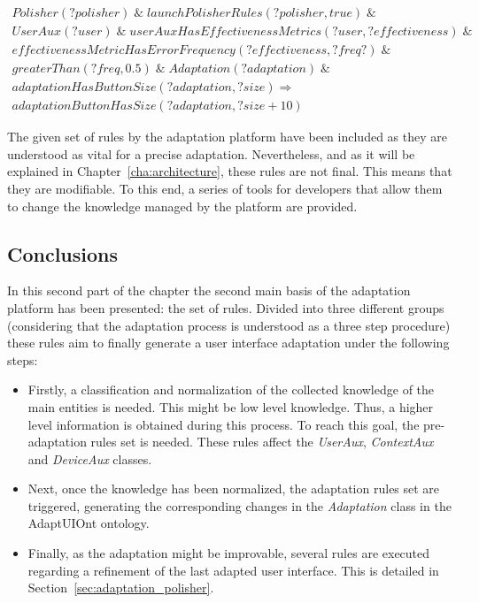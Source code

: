 \footnotesize
\begin{equation} \label{ec:post_adaptation_rule}
  \begin{align*} 
  Polisher(?polisher)\; \&\; launchPolisherRules(?polisher, true)\; \&\\
  UserAux(?user)\; \&\; userAuxHasEffectivenessMetrics(?user, ?effectiveness)\; \& \\
  effectivenessMetricHasErrorFrequency(?effectiveness, ?freq?)\; \&\\
  greaterThan(?freq, 0.5)\; \&\; Adaptation(?adaptation)\; \&\\
  adaptationHasButtonSize(?adaptation, ?size)
  \Rightarrow \\
  adaptationButtonHasSize(?adaptation, ?size + 10)
  \end{align*}
\end{equation}
\normalsize



The given set of rules by the adaptation platform have been included as they are
understood as vital for a precise adaptation. Nevertheless, and as it will be
explained in Chapter~\ref{cha:architecture}, these rules are not final. This
means that they are modifiable. To this end, a series of tools for developers
that allow them to change the knowledge managed by the platform are provided.


\subsection{Conclusions}
\label{sec:rules_conclusions}

In this second part of the chapter the second main basis of the adaptation platform
has been presented: the set of rules. Divided into three different groups
(considering that the adaptation process is understood as a three step procedure)
these rules aim to finally generate a user interface adaptation under the following
steps:

\begin{itemize}
  \item Firstly, a classification and normalization of the collected knowledge of
  the main entities is needed. This might be low level knowledge. Thus, a higher
  level information is obtained during this process. To reach this goal, the
  pre-adaptation rules set is needed. These rules affect the \textit{UserAux},
  \textit{ContextAux} and \textit{DeviceAux} classes.
  
  \item Next, once the knowledge has been normalized, the adaptation rules set
  are triggered, generating the corresponding changes in the \textit{Adaptation}
  class in the AdaptUIOnt ontology.
  
  \item Finally, as the adaptation might be improvable, several rules are executed
  regarding a refinement of the last adapted user interface. This is detailed
  in Section~\ref{sec:adaptation_polisher}.
\end{itemize}